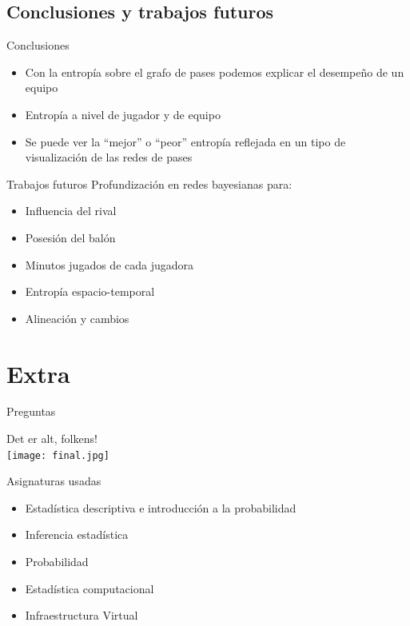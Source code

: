 \documentclass{beamer}
\begin{document}
%
\subsection{Conclusiones y trabajos futuros}

\begin{frame}{Conclusiones}
	\begin{itemize}
		\item Con la entropía sobre el grafo de pases podemos explicar el desempeño de un equipo
		\item Entropía a nivel de jugador y de equipo
		\item Se puede ver la ``mejor'' o ``peor'' entropía reflejada en un tipo de 
		visualización de las redes de pases
	\end{itemize}
\end{frame}

\begin{frame}{Trabajos futuros}
	Profundización en redes bayesianas para:
	\begin{itemize}
		\item Influencia del rival
		\item Posesión del balón
		\item Minutos jugados de cada jugadora
		\item Entropía espacio-temporal
		\item Alineación y cambios
	\end{itemize}
\end{frame}

\section{Extra}

\begin{frame}{Preguntas}
	\begin{center}
		Det er alt, folkens! \\[12pt]
		\texttt{[image: final.jpg]}
    \end{center}
\end{frame}

\begin{frame}{Asignaturas usadas}
	\begin{itemize}
		\item Estadística descriptiva e introducción a la probabilidad 
		\item Inferencia estadística 
		\item Probabilidad 
		\item Estadística computacional 
		\item Infraestructura Virtual
	\end{itemize}
\end{frame}
\end{document}
